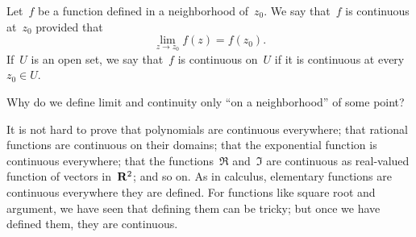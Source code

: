 \documentclass[twocolumn,12pt]{article}
\begin{document}
\begin{definition}
  Let~$f$ be a function defined in a neighborhood of~$z_0$. We say that~$f$ is continuous at~$z_0$ provided that
  \[
    \lim_{z\to z_0} f(z) = f(z_0).
  \]
  If~$U$ is an open set, we say that~$f$ is continuous on~$U$ if it is continuous at every~$z_0 \in U$.
\end{definition}
\begin{koan}
  Why do we define limit and continuity only ``on a neighborhood'' of some point?
\end{koan}
It is not hard to prove that polynomials are continuous everywhere; that rational functions are continuous on their domains; that the exponential function is continuous everywhere; that the functions~$\Re{}$ and~$\Im{}$ are continuous as real-valued function of vectors in~$\mathbf{R}^2$; and so on. As in calculus, elementary functions are continuous everywhere they are defined. For functions like square root and argument, we have seen that defining them can be tricky; but once we have defined them, they are continuous.
\end{document}
